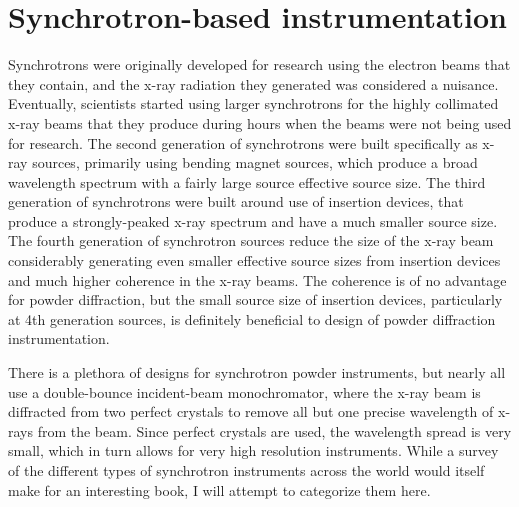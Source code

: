 \section{Synchrotron-based instrumentation}
Synchrotrons were originally developed for research using the electron beams that they contain, and the x-ray radiation they generated was  considered a nuisance. Eventually, scientists started using larger synchrotrons for the highly collimated x-ray beams that they produce during hours when the beams were not being used for research. The second generation of synchrotrons were built specifically as x-ray sources, primarily using bending magnet sources, which produce a broad wavelength spectrum with a fairly large source effective source size. The third generation of synchrotrons were built around use of insertion devices, that produce a strongly-peaked x-ray spectrum and have a much smaller source size. The fourth generation of synchrotron sources reduce the size of the x-ray beam considerably generating even smaller effective source sizes from insertion devices and much higher coherence in the x-ray beams. The coherence is of no advantage for powder diffraction, but the small source size of insertion devices, particularly at 4th generation sources, is definitely beneficial to design of powder diffraction instrumentation. 

There is a plethora of designs for synchrotron powder instruments, but nearly all use a double-bounce incident-beam monochromator, where the x-ray beam is diffracted from two perfect crystals to remove all but one precise wavelength of x-rays from the beam. Since perfect crystals are used, the wavelength spread is very small, which in turn allows for very high resolution instruments. While a survey of the different types of synchrotron instruments across the world would itself make for an interesting book, I will attempt to categorize them here. 
